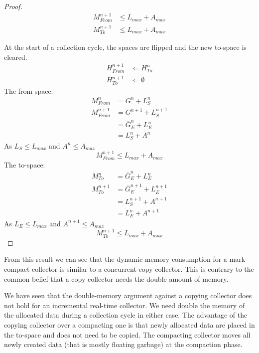 \begin{proof}
\begin{align}
\nonumber
    M_{From}^{n+1} & \le L_{max} + A_{max}\\
    M_{To}^{n+1}   & \le L_{max} + A_{max}
\end{align}



At the start of a collection cycle, the spaces are flipped and the
new to-space is cleared.
%
\begin{align}
\nonumber
    H_{From}^{n+1} & \Leftarrow H_{To}^n\\
    H_{To}^{n+1}   & \Leftarrow \emptyset
\end{align}
%
The from-space:
%
\begin{align}
    M_{From}^{n}  & = G^n + L_S^n\\
    M_{From}^{n+1} & = G^{n+1} + L_S^{n+1}\\
\nonumber
                   & = \overline{G}_E^n + L_E^n\\
                   & = L_S^n + A^n
\end{align}
%
As $L_S \le L_{max}$ and $A^n \le A_{max}$
%
\begin{equation}
    M_{From}^{n+1} \le L_{max} + A_{max}
\end{equation}
%
The to-space:
%
\begin{align}
    M_{To}^{n}     & = \overline{G}_E^n + L_E^n\\
    M_{To}^{n+1}   & = \overline{G}_E^{n+1} + L_E^{n+1}\\
\nonumber
                   & = L_S^{n+1} + A^{n+1}\\
                   & = L_E^{n} + A^{n+1}
\end{align}
%
%
As $L_E \le L_{max}$ and $A^{n+1} \le A_{max}$
%
\begin{equation}
    M_{To}^{n+1} \le L_{max} + A_{max}
\end{equation}
%
\end{proof}

From this result we can see that the dynamic memory consumption for a
mark-compact collector is similar to a concurrent-copy collector.
This is contrary to the common belief that a copy collector needs the
double amount of memory.

We have seen that the double-memory argument against a copying
collector does not hold for an incremental real-time collector. We
need double the memory of the allocated data during a collection
cycle in either case. The advantage of the copying collector over a
compacting one is that newly allocated data are placed in the
to-space and does not need to be copied. The compacting collector
moves all newly created data (that is mostly floating garbage) at the
compaction phase.

